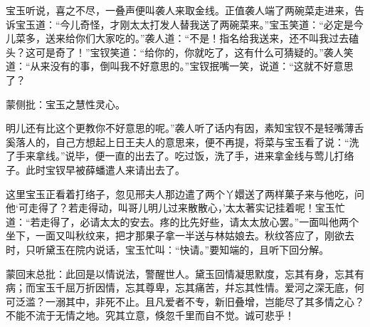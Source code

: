 \begin{parag}


    宝玉听说，喜之不尽，一叠声便叫袭人来取金线。正值袭人端了两碗菜走进来，告诉宝玉道：“今儿奇怪，才刚太太打发人替我送了两碗菜来。”宝玉笑道：“必定是今儿菜多，送来给你们大家吃的。”袭人道：“不是！指名给我送来，还不叫我过去磕头？这可是奇了！”宝钗笑道：“给你的，你就吃了，这有什么可猜疑的。”袭人笑道：“从来没有的事，倒叫我不好意思的。”宝钗抿嘴一笑，说道：“这就不好意思了？\begin{note}蒙侧批：宝玉之慧性灵心。\end{note}明儿还有比这个更教你不好意思的呢。”袭人听了话内有因，素知宝钗不是轻嘴薄舌奚落人的，自己方想起上日王夫人的意思来，便不再提，将菜与宝玉看了说：“洗了手来拿线。”说毕，便一直的出去了。吃过饭，洗了手，进来拿金线与莺儿打络子。此时宝钗早被薛蟠遣人来请出去了。
\end{parag}


\begin{parag}


    这里宝玉正看着打络子，忽见邢夫人那边遣了两个丫嬛送了两样菓子来与他吃，问他‘可走得了？若走得动，叫哥儿明儿过来散散心，’太太著实记挂着呢！宝玉忙道：“若走得了，必请太太的安去。疼的比先好些，请太太放心罢。”一面叫他两个坐下，一面又叫秋纹来，把才那果子拿一半送与林姑娘去。秋纹答应了，刚欲去时，只听黛玉在院内说话，宝玉忙叫：“快请。”要知端的，且听下回分解。
\end{parag}

\begin{parag}

    \begin{note}蒙回末总批：此回是以情说法，警醒世人。黛玉回情凝思默度，忘其有身，忘其有病；而宝玉千屈万折因情，忘其尊卑，忘其痛苦，幷忘其性情。爱河之深无底，何可泛滥？一溺其中，非死不止。且凡爱者不专，新旧叠增，岂能尽了其多情之心？不能不流于无情之地。究其立意，倏忽千里而自不觉。诚可悲乎！\end{note}
\end{parag}

